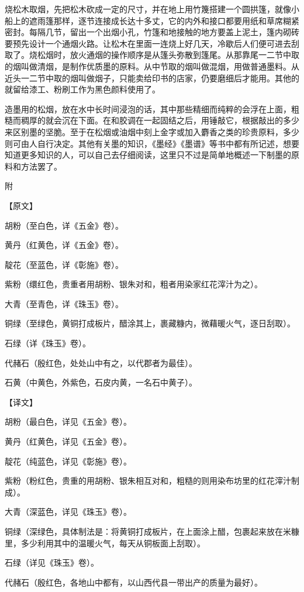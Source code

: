 \documentclass[12pt,UTF8]{ctexbook}
\begin{document}
烧松木取烟，先把松木砍成一定的尺寸，并在地上用竹篾搭建一个圆拱篷，就像小船上的遮雨篷那样，逐节连接成长达十多丈，它的内外和接口都要用纸和草席糊紧密封。每隔几节，留出一个出烟小孔，竹篷和地接触的地方要盖上泥土，篷内砌砖要预先设计一个通烟火路。让松木在里面一连烧上好几天，冷歇后人们便可进去刮取了。烧松烟时，放火通烟的操作顺序是从篷头弥散到篷尾。从那靠尾一二节中取的烟叫做清烟，是制作优质墨的原料。从中节取的烟叫做混烟，用做普通墨料。从近头一二节中取的烟叫做烟子，只能卖给印书的店家，仍要磨细后才能用。其他的就留给漆工、粉刷工作为黑色颜料使用了。

造墨用的松烟，放在水中长时间浸泡的话，其中那些精细而纯粹的会浮在上面，粗糙而稠厚的就会沉在下面。在和胶调在一起固结之后，用锤敲它，根据敲出的多少来区别墨的坚脆。至于在松烟或油烟中刻上金字或加入麝香之类的珍贵原料，多少则可由人自行决定。其他有关墨的知识，《墨经》《墨谱》等书中都有所记述，想要知道更多知识的人，可以自己去仔细阅读，这里只不过是简单地概述一下制墨的原料和方法罢了。

附

【原文】

胡粉（至白色，详《五金》卷）。

黄丹（红黄色，详《五金》卷）。

靛花（至蓝色，详《彰施》卷）。

紫粉（缳红色，贵重者用胡粉、银朱对和，粗者用染家红花滓汁为之）。

大青（至青色，详《珠玉》卷）。

铜绿（至绿色，黄铜打成板片，醋涂其上，裹藏糠内，微藉暖火气，逐日刮取）。

石绿（详《珠玉》卷）。

代赭石（殷红色，处处山中有之，以代郡者为最佳）。

石黄（中黄色，外紫色，石皮内黄，一名石中黄子）。

【译文】

胡粉（最白色，详见《五金》卷）。

黄丹（红黄色，详见《五金》卷）。

靛花（纯蓝色，详见《彰施》卷）。

紫粉（粉红色，贵重的用胡粉、银朱相互对和，粗糙的则用染布坊里的红花滓汁制成）。

大青（深蓝色，详见《珠玉》卷）。

铜绿（深绿色，具体制法是：将黄铜打成板片，在上面涂上醋，包裹起来放在米糠里，多少利用其中的温暖火气，每天从铜板面上刮取）。

石绿（详见《珠玉》卷）。

代赭石（殷红色，各地山中都有，以山西代县一带出产的质量为最好）。
\end{document}
